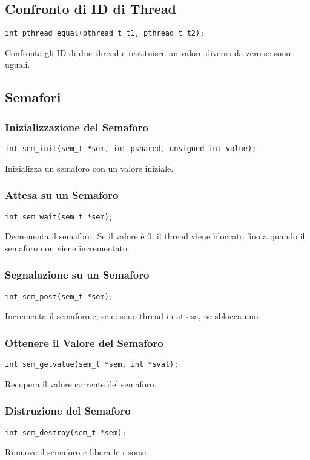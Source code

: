 \documentclass{article}
\begin{document}
\subsection{Confronto di ID di Thread}
\begin{verbatim}
int pthread_equal(pthread_t t1, pthread_t t2);
\end{verbatim}
Confronta gli ID di due thread e restituisce un valore diverso da zero se sono uguali.

\subsection{Semafori}

\subsubsection{Inizializzazione del Semaforo}
\begin{verbatim}
int sem_init(sem_t *sem, int pshared, unsigned int value);
\end{verbatim}
Inizializza un semaforo con un valore iniziale.

\subsubsection{Attesa su un Semaforo}
\begin{verbatim}
int sem_wait(sem_t *sem);
\end{verbatim}
Decrementa il semaforo. Se il valore è 0, il thread viene bloccato fino a quando il semaforo non viene incrementato.

\subsubsection{Segnalazione su un Semaforo}
\begin{verbatim}
int sem_post(sem_t *sem);
\end{verbatim}
Incrementa il semaforo e, se ci sono thread in attesa, ne sblocca uno.

\subsubsection{Ottenere il Valore del Semaforo}
\begin{verbatim}
int sem_getvalue(sem_t *sem, int *sval);
\end{verbatim}
Recupera il valore corrente del semaforo.

\subsubsection{Distruzione del Semaforo}
\begin{verbatim}
int sem_destroy(sem_t *sem);
\end{verbatim}
Rimuove il semaforo e libera le risorse.
\end{document}
